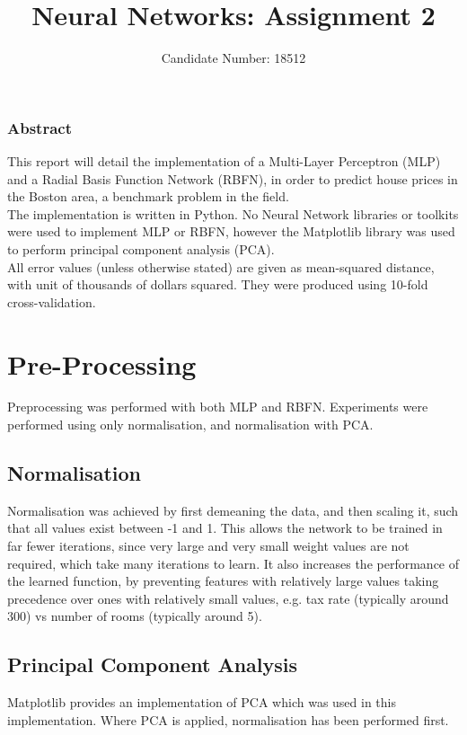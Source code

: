 \documentclass{article}
\title{Neural Networks: Assignment 2}
\author{Candidate Number: 18512}
\begin{document}
\maketitle

\begin{centering}
\subsubsection*{Abstract}
\end{centering}
\noindent This report will detail the implementation of a Multi-Layer Perceptron (MLP) and a Radial Basis Function Network (RBFN), in order to predict house prices in the Boston area, a benchmark problem in the field. \\
\indent The implementation is written in Python. No Neural Network libraries or toolkits were used to implement MLP or RBFN, however the Matplotlib library was used to perform principal component analysis (PCA). \\
\indent All error values (unless otherwise stated) are given as mean-squared distance, with unit of thousands of dollars squared. They were produced using 10-fold cross-validation.
\vspace{4mm}

\section*{Pre-Processing}
\noindent Preprocessing was performed with both MLP and RBFN. Experiments were performed using only normalisation, and normalisation with PCA.
\subsection*{Normalisation}
\noindent Normalisation was achieved by first demeaning the data, and then scaling it, such that all values exist between -1 and 1. This allows the network to be trained in far fewer iterations, since very large and very small weight values are not required, which take many iterations to learn. It also increases the performance of the learned function, by preventing features with relatively large values taking precedence over ones with relatively small values, e.g. tax rate (typically around 300) vs number of rooms (typically around 5).
\subsection*{Principal Component Analysis}
\noindent Matplotlib provides an implementation of PCA which was used in this implementation. Where PCA is applied, normalisation has been performed first.
\end{document}
